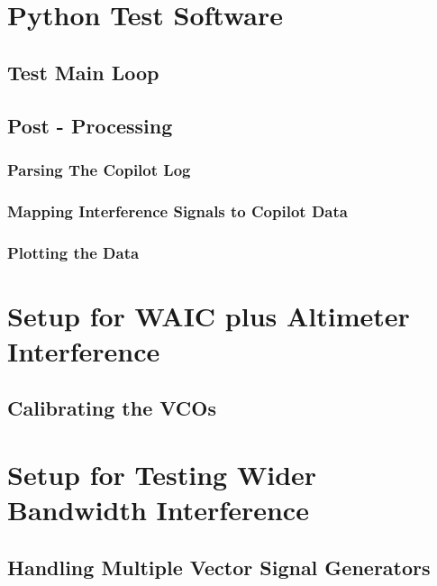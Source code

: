 \section{Python Test Software}




\subsection{Test Main Loop}
\subsection{Post - Processing}
\subsubsection{Parsing The Copilot Log}
\subsubsection{Mapping Interference Signals to Copilot Data}
\subsubsection{Plotting the Data}

\section{Setup for WAIC plus Altimeter Interference}

\subsection{Calibrating the VCOs}

\section{Setup for Testing Wider Bandwidth Interference}

\subsection{Handling Multiple Vector Signal Generators}


